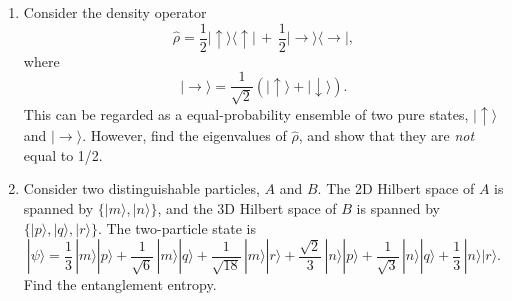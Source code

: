 \documentclass[pra,12pt]{revtex4-2}
\begin{document}
\begin{enumerate}
\begin{enumerate}[(a)]
\end{enumerate}


  

\item Consider the density operator
  \begin{equation}
    \hat{\rho} = \frac{1}{2} |\!\uparrow\rangle \langle\uparrow\!|
    \,+\, \frac{1}{2} |\!\rightarrow\rangle \langle\rightarrow\!|,
    \label{den}
  \end{equation}
  where
  \begin{equation}
    |\!\rightarrow\rangle = \frac{1}{\sqrt{2}} \left(|\!\uparrow\rangle +
  |\!\downarrow\rangle\right).
  \end{equation}
  This can be regarded as a equal-probability ensemble of two pure
  states, $|\!\uparrow\rangle$ and $|\!\rightarrow\rangle$.  However,
  find the eigenvalues of $\hat{\rho}$, and show that they are
  \textit{not} equal to 1/2.
  \label{ex:rho_decomp}

\item 
  Consider two distinguishable particles, $A$ and $B$.  The 2D Hilbert
  space of $A$ is spanned by $\{|m\rangle, |n\rangle\}$, and the
  3D Hilbert space of $B$ is spanned by $\{|p\rangle, |q\rangle,
  |r\rangle\}$.  The two-particle state is
\begin{equation}
  |\psi\rangle = \frac{1}{3} \, |m\rangle|p\rangle
+ \frac{1}{\sqrt{6}} \, |m\rangle|q\rangle
+ \frac{1}{\sqrt{18}} \, |m\rangle|r\rangle
+ \frac{\sqrt{2}}{3} \, |n\rangle|p\rangle
+ \frac{1}{\sqrt{3}} \, |n\rangle|q\rangle
+ \frac{1}{3} \, |n\rangle|r\rangle.
\end{equation}
Find the entanglement entropy.

\end{enumerate}
\end{document}
